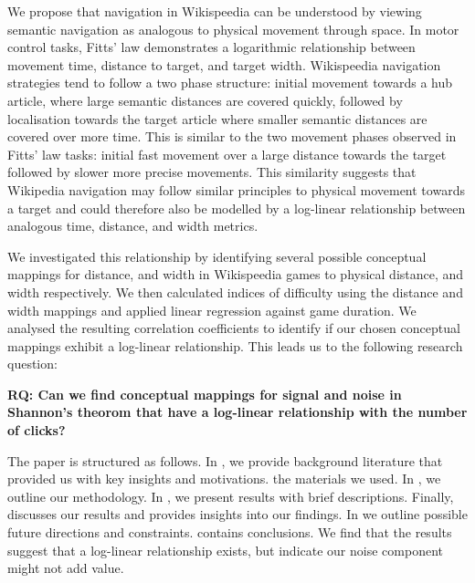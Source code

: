We propose that navigation in Wikispeedia can be understood by viewing semantic navigation as analogous to physical movement through space. In motor control tasks, Fitts' law \cite{fitts_information_1964} demonstrates a logarithmic relationship between movement time, distance to target, and target width. Wikispeedia navigation strategies tend to follow a two phase structure: initial movement towards a hub article, where large semantic distances are covered quickly, followed by localisation towards the target article where smaller semantic distances are covered over more time. This is similar to the two movement phases observed in Fitts' law tasks: initial fast movement over a large distance towards the target followed by slower more precise movements. This similarity suggests that Wikipedia navigation may follow similar principles to physical movement towards a target and could therefore also be modelled by a log-linear relationship between analogous time, distance, and width metrics. 

We investigated this relationship by identifying several possible conceptual mappings for distance, and width in Wikispeedia games to physical distance, and width respectively. We then calculated indices of difficulty using the distance and width mappings and applied linear regression against game duration. We analysed the resulting correlation coefficients to identify if our chosen conceptual mappings exhibit a log-linear relationship. This leads us to the following research question:

\textbf{RQ: Can we find conceptual mappings for signal and noise in Shannon's theorom that have a log-linear relationship with the number of clicks?}

The paper is structured as follows. In , we provide background literature that provided us with key insights and motivations.  the materials we used. In , we outline our methodology. In , we present results with brief descriptions. Finally,  discusses our results and provides insights into our findings. In  we outline possible future directions and constraints.  contains conclusions. We find that the results suggest that a log-linear relationship exists, but indicate our noise component might not add value.

